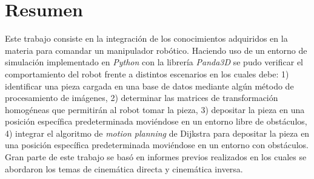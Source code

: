 \section{Resumen}

Este trabajo consiste en la integración de los conocimientos adquiridos en la materia para comandar un manipulador robótico.
Haciendo uso de un entorno de simulación implementado en \textit{Python} con la librería \textit{Panda3D} se pudo verificar el comportamiento del robot frente a distintos escenarios en los cuales debe: 1) identificar una pieza cargada en una base de datos mediante algún método de procesamiento de imágenes, 2) determinar las matrices de transformación homogéneas que permitirán al robot tomar la pieza, 3) depositar la pieza en una posición específica predeterminada moviéndose en un entorno libre de obstáculos, 4) integrar el algoritmo de \textit{motion planning} de Dijkstra para depositar la pieza en una posición específica predeterminada moviéndose en un entorno con obstáculos.
Gran parte de este trabajo se basó en informes previos realizados en los cuales se abordaron los temas de cinemática directa y cinemática inversa.

% 
